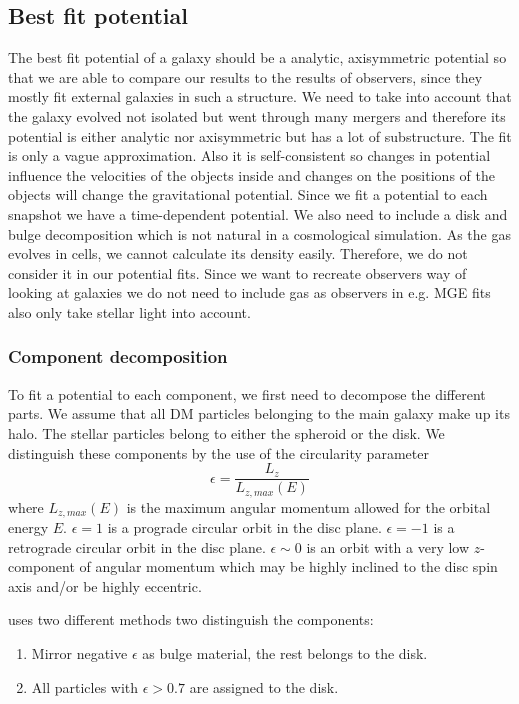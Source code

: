 \subsection{Best fit potential}
The best fit potential of a galaxy should be a analytic, axisymmetric potential so that we are able  to compare our results to the results of observers, since they mostly fit external galaxies in such a structure. We need to take into account that the galaxy evolved not isolated but went through many mergers and therefore its potential is either analytic nor axisymmetric but has a lot of substructure. The fit is only a vague approximation. Also it is self-consistent so changes in potential influence the velocities of the objects inside and changes on the positions of the objects will change the gravitational potential. Since we fit a potential to each snapshot we have a time-dependent potential. We also need to include a disk and bulge decomposition which is not natural in a cosmological simulation. As the gas evolves in cells, we cannot calculate its density easily. Therefore, we do not consider it in our potential fits. Since we want to recreate observers way of looking at galaxies we do not need to include gas as observers in e.g. \ac{MGE} fits \citep{MGE...Monnet, MGE...Emsellem} also only take stellar light into account. 

\subsubsection{Component decomposition}
To fit a potential to each component, we first need to decompose the different parts. We assume that all \ac{DM} particles belonging to the main galaxy make up its halo. The stellar particles belong to either the spheroid or the disk. We distinguish these components by the use of the circularity parameter 
\begin{equation}
    \epsilon = \frac{L_z}{L_{z,max}(E)}
\end{equation}
where $L_{z,max}(E)$ is the maximum angular momentum allowed for the orbital energy $E$. 
$\epsilon = 1$ is a prograde circular orbit in the disc plane. $\epsilon = -1$ is a retrograde circular orbit in the disc plane. $\epsilon \sim 0$ is an orbit with a very low $z$-component of angular momentum which may be highly inclined to the disc spin axis and/or be highly eccentric.  

\cite{AurigaGrand} uses two different methods two distinguish the components:
\begin{enumerate}
\item Mirror negative $\epsilon$ as bulge material, the rest belongs to the disk.
\item All particles with $\epsilon > 0.7$ are assigned to the disk.
\end{enumerate}

